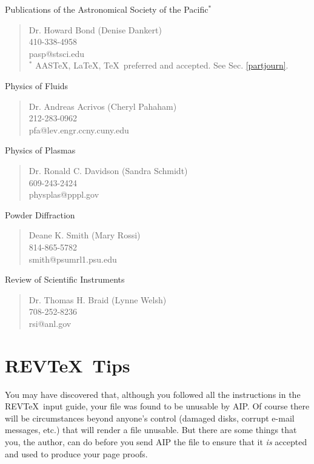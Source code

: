 \noindent      Publications of the Astronomical Society of the Pacific$^*$

\begin{verse}
             Dr. Howard Bond (Denise Dankert)\\
             410-338-4958\\
             pasp@stsci.edu\\
             $^*$ AAS\TeX\/, La\TeX\/, \TeX\ preferred and accepted.
             See Sec. \ref{partjourn}.
\end{verse}

\noindent      Physics of Fluids 

\begin{verse}
             Dr. Andreas Acrivos (Cheryl Pahaham)\\
             212-283-0962\\
             pfa@lev.engr.ccny.cuny.edu
\end{verse}

\noindent      Physics of Plasmas

\begin{verse}
             Dr. Ronald C. Davidson (Sandra Schmidt)\\
             609-243-2424\\
             physplas@pppl.gov
\end{verse}

\noindent      Powder Diffraction

\begin{verse}
             Deane K. Smith (Mary Rossi)\\
             814-865-5782\\
             smith@psumrl1.psu.edu
\end{verse}

\noindent      Review of Scientific Instruments

\begin{verse}
             Dr. Thomas H. Braid (Lynne Welsh)\\
             708-252-8236\\
             rsi@anl.gov
\end{verse}

\section{REV\TeX\ Tips}

You may have discovered that, although you followed all the 
instructions in the REV\TeX\ input guide, 
your file was found to be
unusable by AIP. Of course there will be circumstances beyond anyone's
control (damaged disks, corrupt e-mail messages, etc.) that will render
a file unusable. But there are some things that you, the author, can
do before you send AIP the file to ensure that it {\it is} accepted and used to
produce your page
proofs.

